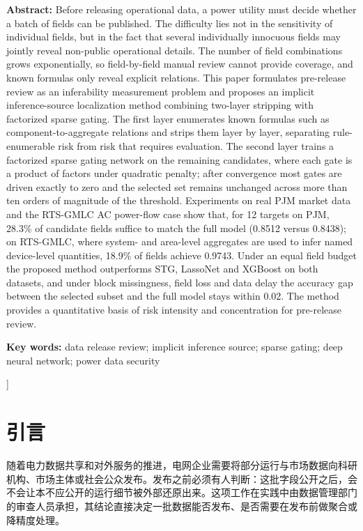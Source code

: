 \documentclass[UTF8,zihao=5,twoside]{ctexart}
\begin{document}
\noindent\textbf{Abstract:} Before releasing operational data, a power utility must decide whether a batch of fields can be published. The difficulty lies not in the sensitivity of individual fields, but in the fact that several individually innocuous fields may jointly reveal non-public operational details. The number of field combinations grows exponentially, so field-by-field manual review cannot provide coverage, and known formulas only reveal explicit relations. This paper formulates pre-release review as an inferability measurement problem and proposes an implicit inference-source localization method combining two-layer stripping with factorized sparse gating. The first layer enumerates known formulas such as component-to-aggregate relations and strips them layer by layer, separating rule-enumerable risk from risk that requires evaluation. The second layer trains a factorized sparse gating network on the remaining candidates, where each gate is a product of factors under quadratic penalty; after convergence most gates are driven exactly to zero and the selected set remains unchanged across more than ten orders of magnitude of the threshold. Experiments on real PJM market data and the RTS-GMLC AC power-flow case show that, for 12 targets on PJM, 28.3\% of candidate fields suffice to match the full model (0.8512 versus 0.8438); on RTS-GMLC, where system- and area-level aggregates are used to infer named device-level quantities, 18.9\% of fields achieve 0.9743. Under an equal field budget the proposed method outperforms STG, LassoNet and XGBoost on both datasets, and under block missingness, field loss and data delay the accuracy gap between the selected subset and the full model stays within 0.02. The method provides a quantitative basis of risk intensity and concentration for pre-release review.\par
\noindent\textbf{Key words:} data release review; implicit inference source; sparse gating; deep neural network; power data security\par\vspace{0.8em}

\vspace{0.8em}
]

\section{引言}

随着电力数据共享和对外服务的推进，电网企业需要将部分运行与市场数据向科研机构、市场主体或社会公众发布\cite{ref-zhu-sharing,ref-liu-cps}。发布之前必须有人判断：这批字段公开之后，会不会让本不应公开的运行细节被外部还原出来。这项工作在实践中由数据管理部门的审查人员承担，其结论直接决定一批数据能否发布、是否需要在发布前做聚合或降精度处理。
\end{document}

